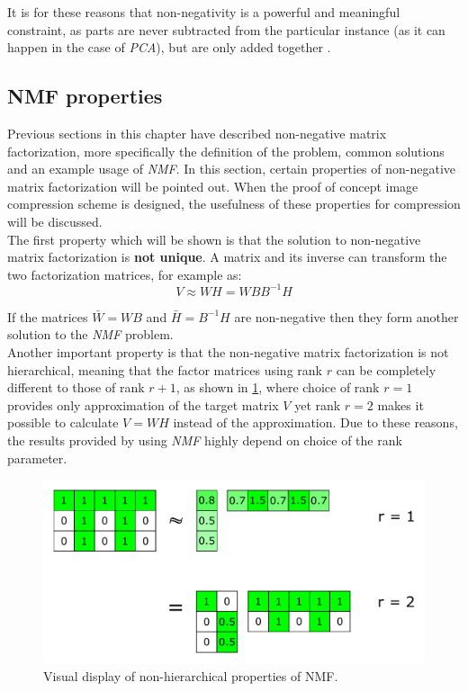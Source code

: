 \documentclass[thesis=M,english]{FITthesis}[2012/10/20]
\begin{document}
It is for these reasons that non-negativity is a powerful and meaningful
constraint, as parts are never subtracted from the particular instance
(as it can happen in the case of \emph{PCA}), but are only added together \cite{nmf-phd-thesis}.
\\

\subsection{NMF properties}
Previous sections in this chapter have described non-negative matrix factorization,
more specifically the definition of the problem, common solutions and an example
usage of \emph{NMF}. In this section, certain properties of non-negative matrix
factorization will be pointed out. When the proof of concept image compression scheme
is designed, the usefulness of these properties for compression will be discussed.
\\

The first property which will be shown is that the solution to non-negative matrix
factorization is \textbf{not unique}. A matrix and its inverse can transform the two
factorization matrices, for example as:
\begin{equation}
  V \approx WH = WBB^{-1}H
\end{equation}

If the matrices $\bar{W} = WB$ and $\bar{H} = B^{-1}H$ are non-negative then they
form another solution to the \emph{NMF} problem.\cite{nmf-nonuniq}
\\

Another important property is that the non-negative matrix factorization is not
hierarchical, meaning that the factor matrices using rank $r$ can be completely
different to those of rank $r+1$, as shown in \ref{fig:nmf-hierarchy}, where choice of
rank $r = 1$ provides only approximation of the target matrix $V$ yet rank $r = 2$ makes it
possible to calculate $V = WH$ instead of the approximation. Due to these
reasons, the results provided by using \emph{NMF} highly depend on choice of the rank
parameter.
\\

\begin{figure}[h]
  \centering
  \caption{Visual display of non-hierarchical properties of NMF. \cite{nonhierarchy}}
  \label{fig:nmf-hierarchy}
  \includegraphics[scale=0.7]{non-hierarchical}
\end{figure}
\end{document}
